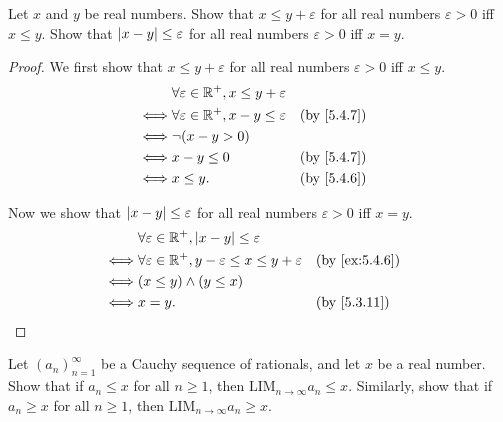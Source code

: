 \begin{ex}\label{ex:5.4.7}
  Let \(x\) and \(y\) be real numbers.
  Show that \(x \leq y + \varepsilon\) for all real numbers \(\varepsilon > 0\) iff \(x \leq y\).
  Show that \(\left\lvert x - y\right\rvert \leq \varepsilon\) for all real numbers \(\varepsilon > 0\) iff \(x = y\).
\end{ex}

\begin{proof}
  We first show that \(x \leq y + \varepsilon\) for all real numbers \(\varepsilon > 0\) iff \(x \leq y\).
  \begin{align*}
         & \forall \varepsilon \in \R^+, x \leq y + \varepsilon                 \\
    \iff & \forall \varepsilon \in \R^+, x - y \leq \varepsilon &  & \by{5.4.7} \\
    \iff & \lnot (x - y > 0)                                                    \\
    \iff & x - y \leq 0                                         &  & \by{5.4.7} \\
    \iff & x \leq y.                                            &  & \by{5.4.6}
  \end{align*}

  Now we show that \(\left\lvert x - y\right\rvert \leq \varepsilon\) for all real numbers \(\varepsilon > 0\) iff \(x = y\).
  \begin{align*}
         & \forall \varepsilon \in \R^+, \abs{x - y} \leq \varepsilon                                   \\
    \iff & \forall \varepsilon \in \R^+, y - \varepsilon \leq x \leq y + \varepsilon &  & \by{ex:5.4.6} \\
    \iff & (x \leq y) \land (y \leq x)                                                                  \\
    \iff & x = y.                                                                    &  & \by{5.3.11}
  \end{align*}
\end{proof}

\begin{ex}\label{ex:5.4.8}
  Let \((a_n)_{n = 1}^{\infty}\) be a Cauchy sequence of rationals, and let \(x\) be a real number.
  Show that if \(a_n \leq x\) for all \(n \geq 1\), then \(\text{LIM}_{n \to \infty} a_n \leq x\).
  Similarly, show that if \(a_n \geq x\) for all \(n \geq 1\), then \(\text{LIM}_{n \to \infty} a_n \geq x\).
\end{ex}


